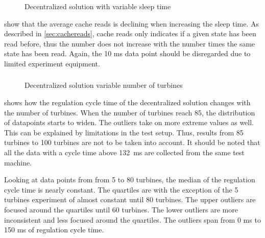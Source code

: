 \begin{figure}[h!]
	\centering
	
	\caption{Decentralized solution with variable sleep time}
	\label{fig:exp:decen:sleep-cache}
\end{figure}

\FloatBarrier

 show that the average cache reads is declining when increasing the sleep time. As described in \cref{sec:cachereads}, cache reads only indicates if a given state has been read before, thus the number does not increase with the number times the same state has been read. Again, the 10 ms data point should be disregarded due to limited experiment equipment.

\clearpage
\subsubsection{}

\begin{figure}[h!]
	\centering
%	
	
	
	\caption{Decentralized solution variable number of turbines}
	\label{fig:exp:decen:turbines}
\end{figure}

 shows how the regulation cycle time of the decentralized solution changes with the number of turbines.
When the number of turbines reach 85, the distribution of datapoints starts to widen. The outliers take on more extreme values as well. This can be explained by limitations in the test setup. Thus, results from 85 turbines to 100 turbines are not to be taken into account.
It should be noted that all the data with a cycle time above 132~ms are collected from the same test machine.

Looking at data points from from 5 to 80 turbines, the median of the regulation cycle time is nearly constant.
The quartiles are with the exception of the 5 turbines experiment of almost constant until 80 turbines. The upper outliers are focused around the quartiles until 60 turbines. The lower outliers are more inconsistent and less focused around the quartiles.
The outliers span from 0 ms to 150 ms of regulation cycle time.

